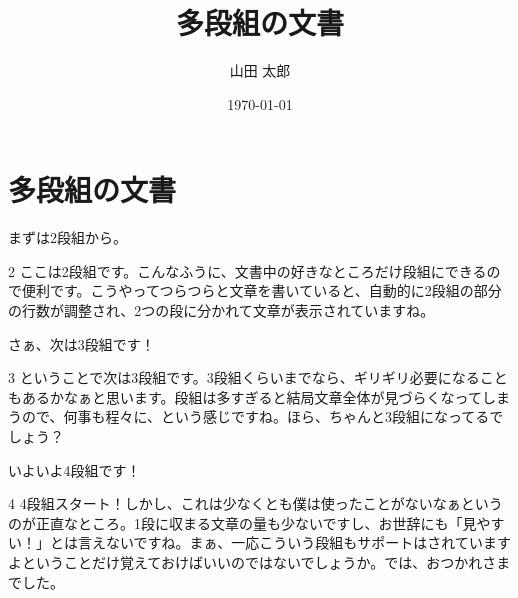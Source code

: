 \documentclass{ltjsarticle}
\title{多段組の文書}
\author{山田 太郎}
\date{\today}
\begin{document}
\maketitle
\section{多段組の文書}
まずは2段組から。
\begin{multicols}{2}
ここは2段組です。こんなふうに、文書中の好きなところだけ段組にできるので便利です。こうやってつらつらと文章を書いていると、自動的に2段組の部分の行数が調整され、2つの段に分かれて文章が表示されていますね。
\end{multicols}
さぁ、次は3段組です！
\begin{multicols}{3}
ということで次は3段組です。3段組くらいまでなら、ギリギリ必要になることもあるかなぁと思います。段組は多すぎると結局文章全体が見づらくなってしまうので、何事も程々に、という感じですね。ほら、ちゃんと3段組になってるでしょう？
\end{multicols}
いよいよ4段組です！
\begin{multicols}{4}
4段組スタート！しかし、これは少なくとも僕は使ったことがないなぁというのが正直なところ。1段に収まる文章の量も少ないですし、お世辞にも「見やすい！」とは言えないですね。まぁ、一応こういう段組もサポートはされていますよということだけ覚えておけばいいのではないでしょうか。では、おつかれさまでした。
\end{multicols}
\end{document}
